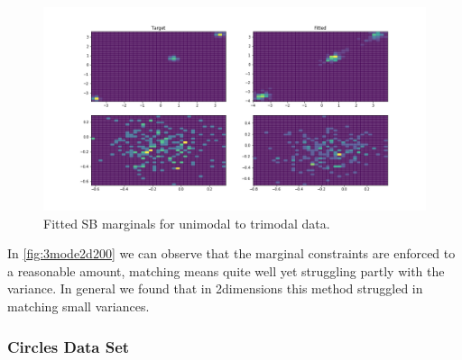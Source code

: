 \documentclass[a4paper,12pt,twoside,openright]{report}
\theoremstyle{definition}
\begin{document}
\begin{figure}
    \centering
    \includegraphics[scale=0.4,trim={4.3cm 1cm 2.5cm 0}, clip]{images/GP/2d_3mode_GP_means_3.3_3.6_0.7_std_0.1_hist_200.png}
    \caption{ Fitted SB marginals for unimodal to trimodal data.  }
    \label{fig:3mode2d200hist}
\end{figure}
In \ref{fig:3mode2d200} we can observe that the marginal constraints are enforced to a reasonable amount, matching means quite well yet struggling partly with the variance. In general we found that in 2dimensions this method struggled in matching small variances.

\subsubsection{Circles Data Set}
\end{document}
